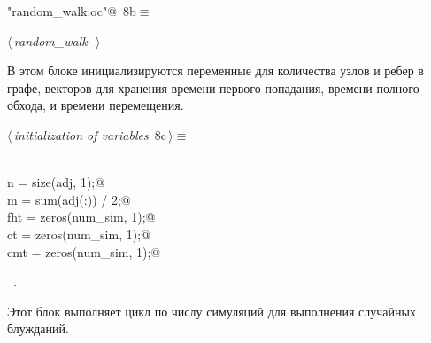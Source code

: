 \documentclass{article}
\begin{document}
\begin{flushleft} \small
\begin{minipage}{\linewidth}\label{scrap2}\raggedright\small
{} \verb@"random_walk.oc"@\nobreak\ {\footnotesize {8b}}$\equiv$
\vspace{-1ex}
\begin{list}{}{} \item
\mbox{}\verb@@\hbox{$\langle\,${\itshape random_walk}\nobreak\ {\footnotesize {}}$\,\rangle$}\verb@@{\NWsep}
\end{list}
\vspace{-1.5ex}
\footnotesize
\begin{list}{}{\setlength{\itemsep}{-\parsep}\setlength{\itemindent}{-\leftmargin}}

\item{}
\end{list}
\end{minipage}\vspace{4ex}
\end{flushleft}
В этом блоке инициализируются переменные для количества узлов и ребер в графе, векторов для хранения времени первого попадания, времени полного обхода, и времени перемещения.

\begin{flushleft} \small
\begin{minipage}{\linewidth}\label{scrap3}\raggedright\small
{} $\langle\,${\itshape initialization of variables}\nobreak\ {\footnotesize {8c}}$\,\rangle\equiv$
\vspace{-1ex}
\begin{list}{}{} \item
\mbox{}\verb@@\\
\mbox{}\verb@    n = size(adj, 1);@\\
\mbox{}\verb@    m = sum(adj(:)) / 2;@\\
\mbox{}\verb@    fht = zeros(num_sim, 1);@\\
\mbox{}\verb@    ct = zeros(num_sim, 1);@\\
\mbox{}\verb@    cmt = zeros(num_sim, 1);@\\
\mbox{}\verb@@{\NWsep}
\end{list}
\vspace{-1.5ex}
\footnotesize
\begin{list}{}{\setlength{\itemsep}{-\parsep}\setlength{\itemindent}{-\leftmargin}}
\item \NWtxtMacroRefIn\ .

\item{}
\end{list}
\end{minipage}\vspace{4ex}
\end{flushleft}
Этот блок выполняет цикл по числу симуляций для выполнения случайных блужданий.
\end{document}
